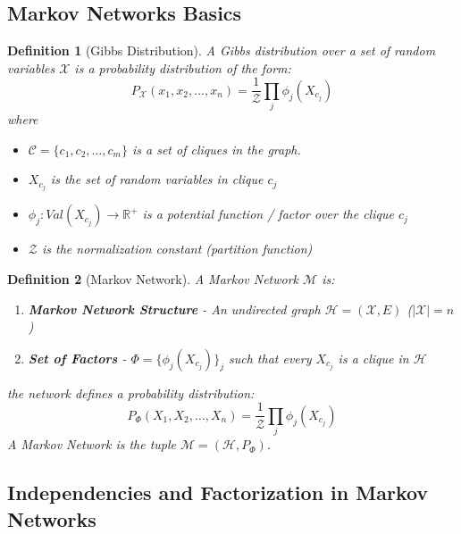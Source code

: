 \documentclass[11pt]{article}
\numberwithin{equation}{section}
\theoremstyle{boldStyle}
\theoremstyle{boldBlueStyle}
\theoremstyle{boldPurpleStyle}
\theoremstyle{boldRedStyle}
\newtheorem{definition}{Definition}[section]
\begin{document}
\subsection{Markov Networks Basics}

\begin{definition}[Gibbs Distribution]
    A Gibbs distribution over a set of random variables $\mathcal{X}$ is a probability distribution of the form:
    \begin{equation*}
        P_{\mathcal{X}}(x_1, x_2, \ldots, x_n) = \frac{1}{\mathcal{Z}} \prod_{j} \phi_j(X_{c_j})
    \end{equation*}
    where
    \begin{itemize}
        \item $\mathcal{C} = \{ c_1, c_2, \ldots, c_m \}$ is a set of cliques in the graph. 
        \item $X_{c_j}$ is the set of random variables in clique $c_j$
        \item $\phi_j : Val(X_{c_j}) \rightarrow \mathbb{R}^+$ is a potential function / factor over the clique $c_j$
        \item $\mathcal{Z}$ is the normalization constant (partition function)
    \end{itemize}
\end{definition}

\begin{definition}[Markov Network]
    A Markov Network $\mathcal{M}$ is:
    \begin{enumerate}
        \item \textbf{Markov Network Structure} - An undirected graph $\mathcal{H} = (\mathcal{X}, E)$  ($|\mathcal{X}| = n$)
        \item \textbf{Set of Factors} - $\Phi = \{ \phi_j(X_{c_j}) \}_{j}$ such that every $X_{c_j}$ is a clique in $\mathcal{H}$
    \end{enumerate}
    the network defines a probability distribution: 
    \begin{equation*}
        P_{\Phi}(X_1, X_2, \ldots, X_n) = \frac{1}{\mathcal{Z}} \prod_{j} \phi_j(X_{c_j})
    \end{equation*}
    A Markov Network is the tuple $\mathcal{M} = (\mathcal{H}, P_{\Phi})$.
\end{definition}


\subsection{Independencies and Factorization in Markov Networks}
\end{document}
